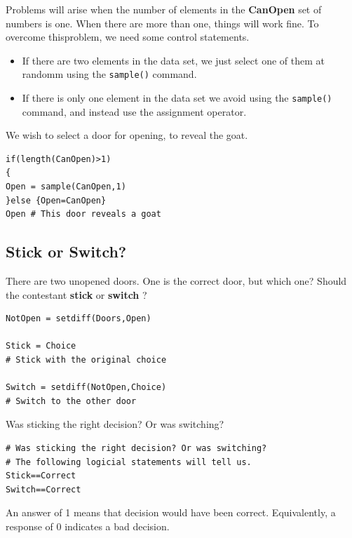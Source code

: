 \documentclass[11pt]{article} %
\begin{document}
Problems will arise when the number of elements in the \textbf{CanOpen} set of numbers is one.
When there are more than one, things will work fine.
To overcome thisproblem, we need some control statements.
\begin{itemize}
\item  If there are two elements in the data set, we just select one of them at randomm using the \texttt{sample()} command.
\item If there is only one element in the data set we avoid using the \texttt{sample()} command, and instead use the assignment operator.
\end{itemize}
We wish to select a door for opening, to reveal the goat.
\begin{framed}
\begin{verbatim}
if(length(CanOpen)>1)
{
Open = sample(CanOpen,1)
}else {Open=CanOpen}
Open # This door reveals a goat
\end{verbatim}
\end{framed}
\subsection{Stick or Switch?}
There are two unopened doors. One is the correct door, but which one? Should the contestant \textbf{stick} or \textbf{switch} ?

\begin{framed}
\begin{verbatim}
NotOpen = setdiff(Doors,Open)

Stick = Choice
# Stick with the original choice

Switch = setdiff(NotOpen,Choice)
# Switch to the other door
\end{verbatim}
\end{framed}

Was sticking the right decision? Or was switching?

\begin{framed}
\begin{verbatim}
# Was sticking the right decision? Or was switching?
# The following logicial statements will tell us.
Stick==Correct
Switch==Correct
\end{verbatim}
\end{framed}

An answer of 1 means that decision would have been correct. Equivalently, a response of 0 indicates a bad decision.
\end{document}
